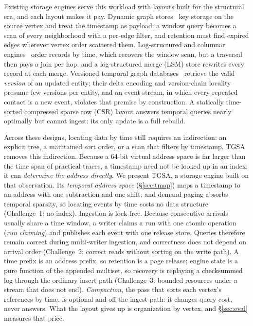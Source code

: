 \documentclass[sigconf,nonacm]{acmart}
\newcommand{\sys}{TGSA\xspace}
\begin{document}
Existing storage engines serve this workload with layouts built for the
structural era, and each layout makes it pay. Dynamic graph
stores~\cite{kumar2019graphone, zhu2020livegraph, dhulipala2019aspen,
fuchs2023sortledton, deleo2021teseo, ediger2012stinger} key storage on
the source vertex and treat the timestamp as payload: a window query
becomes a scan of every neighborhood with a per-edge filter, and
retention must find expired edges wherever vertex order scattered them.
Log-structured and columnar engines~\cite{oneil1996lsm, luo2020lsmsurvey, dong2021rocksdb,
raasveldt2019duckdb} order records by time, which recovers the window
scan, but a traversal then pays a join per hop, and a log-structured
merge (LSM) store rewrites every record at each merge. Versioned
temporal graph databases~\cite{li2026tva, hou2024aeong,
theodorakis2024aion, huang2016tgraph} retrieve the valid \emph{version} of an updated
entity; their delta encoding and version-chain locality presume few
versions per entity, and an event stream, in which every repeated
contact is a new event, violates that premise by construction. A
statically time-sorted compressed sparse row (CSR) layout answers
temporal queries nearly optimally but cannot ingest: its only update is
a full rebuild.

Across these designs, locating data by time still requires an
indirection: an explicit tree, a maintained sort order, or a scan that
filters by timestamp. \sys removes this indirection. Because a 64-bit
virtual address space is far larger than the time span of practical
traces, a timestamp need not be looked up in an index; it can
\emph{determine the address directly}.
We present \sys, a storage engine built on that observation. Its \emph{temporal
address space} (\S\ref{sec:tmap}) maps a timestamp to an address with
one subtraction and one shift, and demand paging absorbs temporal
sparsity, so locating events by time costs no data structure
(Challenge~1: no index). Ingestion is lock-free. Because consecutive arrivals usually share a
time window, a writer claims a run with one atomic operation
(\emph{run claiming}) and publishes each event with one release store.
Queries therefore remain correct during multi-writer ingestion, and
correctness does not depend on arrival order (Challenge~2: correct reads without sorting on
the write path). A time prefix is an address prefix, so retention is a
page release; engine state is a pure function of the appended multiset,
so recovery is replaying a checksummed log through the ordinary insert
path (Challenge~3: bounded resources under a stream that does not end).
\emph{Compaction}, the pass that sorts each vertex's references by
time, is optional and off the ingest path: it changes query cost, never
answers. What the layout gives up is organization by vertex, and
\S\ref{sec:eval} measures that price.
\end{document}
